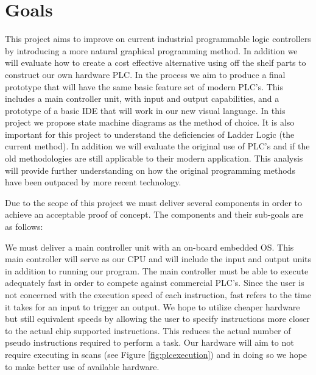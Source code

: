 \section{Goals}

This project aims to improve on current industrial programmable logic controllers by introducing a more natural graphical programming method. In addition we will evaluate how to create a cost effective alternative using off the shelf parts to construct our own hardware PLC. In the process we aim to produce a final prototype that will have the same basic feature set of modern PLC's. This includes a main controller unit, with input and output capabilities, and a prototype of a basic IDE that will work in our new visual language. In this project we propose state machine diagrams as the method of choice. It is also important for this project to understand the deficiencies of Ladder Logic (the current method). In addition we will evaluate the original use of PLC's and if the old methodologies are still applicable to their modern application. This analysis will provide further understanding on how the original programming methods have been outpaced by more recent technology.

Due to the scope of this project we must deliver several components in order to achieve an acceptable proof of concept. The components and their sub-goals are as follows:

We must deliver a main controller unit with an on-board embedded OS. This main controller will serve as our CPU and will include the input and output units in addition to running our program. The main controller must be able to execute adequately fast in order to compete against commercial PLC's. Since the user is not concerned with the execution speed of each instruction, fast refers to the time it takes for an input to trigger an output. We hope to utilize cheaper hardware but still equivalent speeds by allowing the user to specify instructions more closer to the actual chip supported instructions. This reduces the actual number of pseudo instructions required to perform a task. Our hardware will aim to not require executing in scans (see Figure \ref{fig:plcexecution}) and in doing so we hope to make better use of available hardware.

